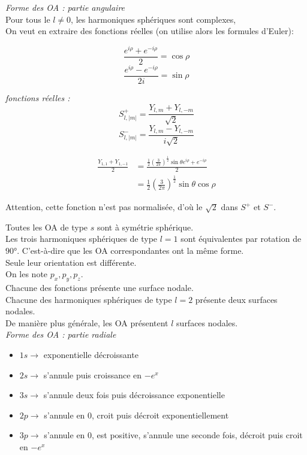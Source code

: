 \documentclass[../main.tex]{subfile}
\begin{document}
\emph{Forme des OA : partie angulaire}\\
Pour tous le $l \neq 0$, les harmoniques sphériques sont complexes, \\
On veut en extraire des fonctions réelles (on utilise alors les formules d'Euler):
\begin{rap}
      $$\frac{e^{i\rho}+e^{-i\rho}}{2}=\cos{\rho}$$
      $$\frac{e^{i\rho}-e^{-i\rho}}{2i}=\sin{\rho}$$
\end{rap}

\emph{fonctions réelles :}
   $$S_{l, |m|}^+ = \frac{Y_{l,m} + Y_{l,-m}}{\sqrt{2}}$$
   $$S_{l, |m|}^- = \frac{Y_{l,m} - Y_{l,-m}}{i\sqrt{2}}$$

  \begin{ex} 
      $$
     \begin{aligned}
        \frac{Y_{1,1} + Y_{1,-1}}{2} &= \frac{\frac{1}{2}(\frac{3}{2\pi})^{\frac{1}{2}}\sin \theta e^{i\rho}+ e^{-i\rho}}{2}\\
        &= \frac{1}{2} (\frac{3}{2\pi})^{\frac{1}{2}}\sin \theta \cos \rho
     \end{aligned}
      $$
     \begin{rema} 
         Attention, cette fonction n'est pas normalisée, d'où le $\sqrt{2}$ dans $S^+$ et $S^-$.
     \end{rema}
  \end{ex}

  Toutes les OA de type $s$ sont à symétrie sphérique.\\

  Les trois harmoniques sphériques de type $l=1$ sont équivalentes par rotation de $90°$.
  C'est-à-dire que les OA correspondantes ont la même forme.\\
  Seule leur orientation est différente.\\
  On les note $p_x, p_y, p_z$.\\
  Chacune des fonctions présente une surface nodale.\\

  Chacune des harmoniques sphériques de type $l=2$ présente deux surfaces nodales.\\

  De manière plus générale, les OA présentent $l$ surfaces nodales.\\


\emph{Forme des OA : partie radiale}\\

  \begin{itemize} 
     \item $1s \rightarrow $ exponentielle décroissante %
     \item $2s \rightarrow $ s'annule puis croissance en $-e^x$ %
     \item $3s \rightarrow $ s'annule deux fois puis décroissance exponentielle %
     \item $2p \rightarrow $ s'annule en $0$, croit puis décroit exponentiellement %
     \item $3p \rightarrow $ s'annule en 0, est positive, s'annule une seconde fois, décroit puis croit en $-e^x$%
  \end{itemize}
\end{document}
